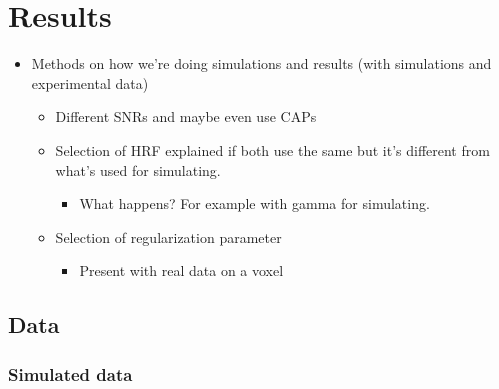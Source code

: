 \section{Results}

\begin{itemize}
    \item Methods on how we're doing simulations and results (with simulations and experimental data)
    \begin{itemize}
        \item Different SNRs and maybe even use CAPs
        \item Selection of HRF explained if both use the same but it's different from what's used for simulating.
        \begin{itemize}
            \item What happens? For example with gamma for simulating.
        \end{itemize}
        \item Selection of regularization parameter
        \begin{itemize}
            \item Present with real data on a voxel
        \end{itemize}
    \end{itemize}
\end{itemize}

\subsection{Data}

\subsubsection{Simulated data}

